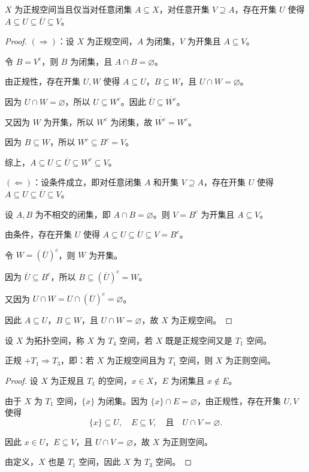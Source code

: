 \documentclass[lang=cn,a4paper,newtx,figureplace=section,tableplace=section]{elegantbook}
\begin{document}
\begin{proposition}\label{prop:normal-characterization}
$X$ 为正规空间当且仅当对任意闭集 $A \subseteq X$，对任意开集 $V \supseteq A$，存在开集 $U$ 使得 $A \subseteq U \subseteq \overline{U} \subseteq V$。
\end{proposition}
\begin{proof}
$(\Rightarrow)$：设 $X$ 为正规空间，$A$ 为闭集，$V$ 为开集且 $A \subseteq V$。

令 $B = V^c$，则 $B$ 为闭集，且 $A \cap B = \varnothing$。

由正规性，存在开集 $U, W$ 使得 $A \subseteq U$，$B \subseteq W$，且 $U \cap W = \varnothing$。

因为 $U \cap W = \varnothing$，所以 $U \subseteq W^c$。因此 $\overline{U} \subseteq \overline{W^c}$。

又因为 $W$ 为开集，所以 $W^c$ 为闭集，故 $\overline{W^c} = W^c$。

因为 $B \subseteq W$，所以 $W^c \subseteq B^c = V$。

综上，$A \subseteq U \subseteq \overline{U} \subseteq W^c \subseteq V$。

$(\Leftarrow)$：设条件成立，即对任意闭集 $A$ 和开集 $V \supseteq A$，存在开集 $U$ 使得 $A \subseteq U \subseteq \overline{U} \subseteq V$。

设 $A, B$ 为不相交的闭集，即 $A \cap B = \varnothing$。则 $V = B^c$ 为开集且 $A \subseteq V$。

由条件，存在开集 $U$ 使得 $A \subseteq U \subseteq \overline{U} \subseteq V = B^c$。

令 $W = (\overline{U})^c$，则 $W$ 为开集。

因为 $\overline{U} \subseteq B^c$，所以 $B \subseteq (\overline{U})^c = W$。

又因为 $U \cap W = U \cap (\overline{U})^c = \varnothing$。

因此 $A \subseteq U$，$B \subseteq W$，且 $U \cap W = \varnothing$，故 $X$ 为正规空间。
\end{proof}

\begin{definition}[$T_4$ 空间]\label{def:T4-space}
设 $X$ 为拓扑空间，称 $X$ 为 $T_4$ 空间，若 $X$ 既是正规空间又是 $T_1$ 空间。
\end{definition}

\begin{proposition}\label{prop:normal-T1-implies-T3}
正规 $+ T_1 \Rightarrow T_3$，即：若 $X$ 为正规空间且为 $T_1$ 空间，则 $X$ 为正则空间。
\end{proposition}
\begin{proof}
设 $X$ 为正规且 $T_1$ 的空间，$x \in X$，$E$ 为闭集且 $x \notin E$。

由于 $X$ 为 $T_1$ 空间，$\{x\}$ 为闭集。因为 $\{x\} \cap E = \varnothing$，由正规性，存在开集 $U, V$ 使得
\begin{equation}
\{x\} \subseteq U, \quad E \subseteq V, \quad \text{且} \quad U \cap V = \varnothing.
\end{equation}

因此 $x \in U$，$E \subseteq V$，且 $U \cap V = \varnothing$，故 $X$ 为正则空间。

由定义，$X$ 也是 $T_1$ 空间，因此 $X$ 为 $T_3$ 空间。
\end{proof}
\end{document}
